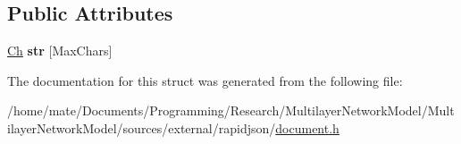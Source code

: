 \subsection*{Public Attributes}
\begin{DoxyCompactItemize}
\item 
\hyperlink{classGenericValue_ade0e0ce64ccd5d852da57a35e720bafb}{Ch} {\bfseries str} \mbox{[}Max\+Chars\mbox{]}\hypertarget{structGenericValue_1_1ShortString_a444e24523d4cc33830d18a2cfcfd333b}{}\label{structGenericValue_1_1ShortString_a444e24523d4cc33830d18a2cfcfd333b}

\end{DoxyCompactItemize}


The documentation for this struct was generated from the following file\+:\begin{DoxyCompactItemize}
\item 
/home/mate/\+Documents/\+Programming/\+Research/\+Multilayer\+Network\+Model/\+Multilayer\+Network\+Model/sources/external/rapidjson/\hyperlink{document_8h}{document.\+h}\end{DoxyCompactItemize}

